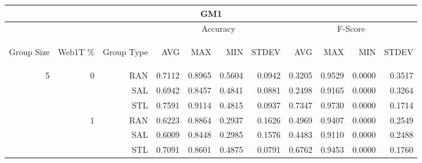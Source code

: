 \begin{center}
\begin{table}[htbp] 
 \begin{center}
\begin{tabular}{ | r | r | r | r | r | r | r | r | r | r | r |}
\hline
\multicolumn{11}{|c|}{GM1}\\
\hline
 & & & \multicolumn{4}{|c|}{Accuracy} & \multicolumn{4}{|c|}{F-Score}\\ \cline{4-11}
\begin{sideways}Group Size\end{sideways} & \begin{sideways}Web1T \%\end{sideways} & \begin{sideways}Group Type\end{sideways} & \begin{sideways}AVG\end{sideways} & \begin{sideways}MAX\end{sideways} & \begin{sideways}MIN\end{sideways} & \begin{sideways}STDEV\end{sideways} & \begin{sideways}AVG\end{sideways} & \begin{sideways}MAX\end{sideways} & \begin{sideways}MIN\end{sideways} & \begin{sideways}STDEV\end{sideways}\\
\hline
\multirow{18}{*}{5}
 & \multirow{3}{*}{0} & RAN & 0.7112 & 0.8965 & 0.5604 & 0.0942 & 0.3205 & 0.9529 & 0.0000 & 0.3517\\ \cline{3-11}
 &   & SAL & 0.6942 & 0.8457 & 0.4841 & 0.0881 & 0.2498 & 0.9165 & 0.0000 & 0.3264\\ \cline{3-11}
 &   & STL & 0.7591 & 0.9114 & 0.4815 & 0.0937 & 0.7347 & 0.9730 & 0.0000 & 0.1714\\ \cline{2-11}
 & \multirow{3}{*}{1} & RAN & 0.6223 & 0.8864 & 0.2937 & 0.1626 & 0.4969 & 0.9407 & 0.0000 & 0.2549\\ \cline{3-11}
 &   & SAL & 0.6009 & 0.8448 & 0.2985 & 0.1576 & 0.4483 & 0.9110 & 0.0000 & 0.2488\\ \cline{3-11}
 &   & STL & 0.7091 & 0.8601 & 0.4875 & 0.0791 & 0.6762 & 0.9453 & 0.0000 & 0.1760\\ \cline{2-11}

\end{tabular}
\end{center}
\end{table}
\end{center}
